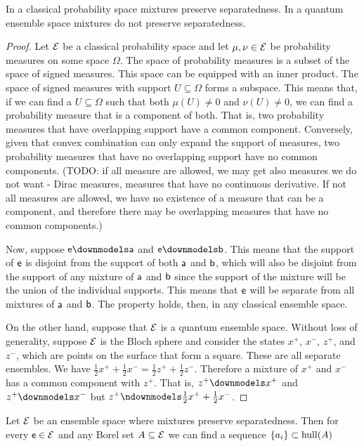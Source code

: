 \begin{conj}
	In a classical probability space mixtures preserve separatedness. In a quantum ensemble space mixtures do not preserve separatedness.
\end{conj}

\begin{proof}
	Let $\Ens$ be a classical probability space and let $\mu, \nu \in \Ens$ be probability measures on some space $\Omega$. The space of probability measures is a subset of the space of signed measures. This space can be equipped with an inner product. The space of signed measures with support $U \subseteq \Omega$ forms a subspace. This means that, if we can find a $U \subseteq \Omega$ such that both $\mu(U) \neq 0$ and $\nu(U) \neq 0$, we can find a probability measure that is a component of both. That is, two probability measures that have overlapping support have a common component. Conversely, given that convex combination can only expand the support of measures, two probability measures that have no overlapping support have no common components. (TODO: if all measure are allowed, we may get also measures we do not want - Dirac measures, measures that have no continuous derivative. If not all measures are allowed, we have no existence of a measure that can be a component, and therefore there may be overlapping measures that have no common components.)
	
	Now, suppose $\ens \separate \ens[a]$ and $\ens \separate \ens[b]$. This means that the support of $\ens$ is disjoint from the support of both $\ens[a]$ and $\ens[b]$, which will also be disjoint from the support of any mixture of $\ens[a]$ and $\ens[b]$ since the support of the mixture will be the union of the individual supports. This means that $\ens$ will be separate from all mixtures of $\ens[a]$ and $\ens[b]$. The property holds, then, in any classical ensemble space.
	
	On the other hand, suppose that $\Ens$ is a quantum ensemble space. Without loss of generality, suppose $\Ens$ is the Bloch sphere and consider the states $x^+$, $x^-$, $z^+$, and $z^-$, which are points on the surface that form a square. These are all separate ensembles. We have $\frac{1}{2} x^+ + \frac{1}{2} x^- = \frac{1}{2} z^+ + \frac{1}{2} z^-$. Therefore a mixture of $x^+$ and $x^-$ has a common component with $z^+$. That is, $z^+ \separate x^+$ and $z^+ \separate x^-$ but $z^+ \nseparate \frac{1}{2} x^+ + \frac{1}{2} x^-$.
\end{proof}

\begin{prop}
	Let $\Ens$ be an ensemble space where mixtures preserve separatedness. Then for every $\ens \in \Ens$ and any Borel set $A \subseteq \Ens$ we can find a sequence $\{a_i\} \subset \hull(A) $
\end{prop}

